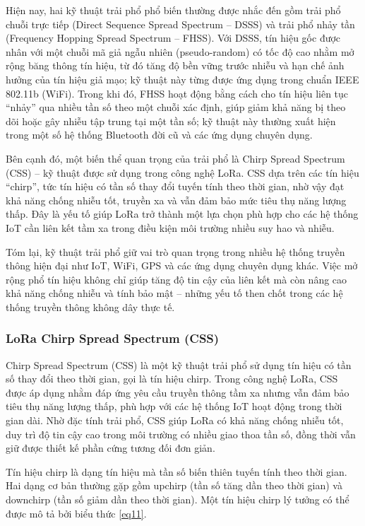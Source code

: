 \documentclass{article}
\begin{document}
	Hiện nay, hai kỹ thuật trải phổ phổ biến thường được nhắc đến gồm trải phổ chuỗi trực tiếp (Direct Sequence Spread Spectrum – DSSS) và trải phổ nhảy tần (Frequency Hopping Spread Spectrum – FHSS). Với DSSS, tín hiệu gốc được nhân với một chuỗi mã giả ngẫu nhiên (pseudo-random) có tốc độ cao nhằm mở rộng băng thông tín hiệu, từ đó tăng độ bền vững trước nhiễu và hạn chế ảnh hưởng của tín hiệu giả mạo; kỹ thuật này từng được ứng dụng trong chuẩn IEEE 802.11b (WiFi). Trong khi đó, FHSS hoạt động bằng cách cho tín hiệu liên tục “nhảy” qua nhiều tần số theo một chuỗi xác định, giúp giảm khả năng bị theo dõi hoặc gây nhiễu tập trung tại một tần số; kỹ thuật này thường xuất hiện trong một số hệ thống Bluetooth đời cũ và các ứng dụng chuyên dụng.
	
	Bên cạnh đó, một biến thể quan trọng của trải phổ là Chirp Spread Spectrum (CSS) – kỹ thuật được sử dụng trong công nghệ LoRa. CSS dựa trên các tín hiệu “chirp”, tức tín hiệu có tần số thay đổi tuyến tính theo thời gian, nhờ vậy đạt khả năng chống nhiễu tốt, truyền xa và vẫn đảm bảo mức tiêu thụ năng lượng thấp. Đây là yếu tố giúp LoRa trở thành một lựa chọn phù hợp cho các hệ thống IoT cần liên kết tầm xa trong điều kiện môi trường nhiều suy hao và nhiễu.
	
	Tóm lại, kỹ thuật trải phổ giữ vai trò quan trọng trong nhiều hệ thống truyền thông hiện đại như IoT, WiFi, GPS và các ứng dụng chuyên dụng khác. Việc mở rộng phổ tín hiệu không chỉ giúp tăng độ tin cậy của liên kết mà còn nâng cao khả năng chống nhiễu và tính bảo mật – những yếu tố then chốt trong các hệ thống truyền thông không dây thực tế.
	
	\subsubsection{LoRa Chirp Spread Spectrum (CSS)}
	
	Chirp Spread Spectrum (CSS) là một kỹ thuật trải phổ sử dụng tín hiệu có tần số thay đổi theo thời gian, gọi là tín hiệu chirp. Trong công nghệ LoRa, CSS được áp dụng nhằm đáp ứng yêu cầu truyền thông tầm xa nhưng vẫn đảm bảo tiêu thụ năng lượng thấp, phù hợp với các hệ thống IoT hoạt động trong thời gian dài. Nhờ đặc tính trải phổ, CSS giúp LoRa có khả năng chống nhiễu tốt, duy trì độ tin cậy cao trong môi trường có nhiều giao thoa tần số, đồng thời vẫn giữ được thiết kế phần cứng tương đối đơn giản.
	
	Tín hiệu chirp là dạng tín hiệu mà tần số biến thiên tuyến tính theo thời gian. Hai dạng cơ bản thường gặp gồm upchirp (tần số tăng dần theo thời gian) và downchirp (tần số giảm dần theo thời gian). Một tín hiệu chirp lý tưởng có thể được mô tả bởi biểu thức \ref{eq11}.
	
\end{document}
